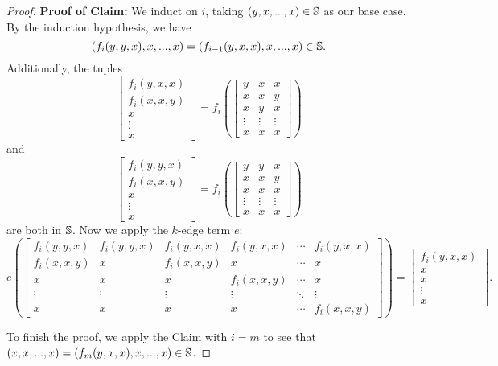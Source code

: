 \documentclass[letterpaper,11pt]{article}
\begin{document}
\begin{proof}
{\bf Proof of Claim:} We induct on $i$, taking $(y,x,...,x) \in \mathbb{S}$ as our base case. By the induction hypothesis, we have
\[
(f_i(y,y,x),x,...,x) = (f_{i-1}(y,x,x),x,...,x) \in \mathbb{S}.
\]
Additionally, the tuples
\[
\begin{bmatrix} f_i(y,x,x)\\ f_i(x,x,y)\\ x\\ \vdots \\ x\end{bmatrix} = f_i\left(\begin{bmatrix} y & x & x\\ x & x & y\\ x & y & x\\ \vdots & \vdots & \vdots \\ x & x & x\end{bmatrix}\right)
\]
and
\[
\begin{bmatrix} f_i(y,y,x)\\ f_i(x,x,y)\\ x\\ \vdots \\ x\end{bmatrix} = f_i\left(\begin{bmatrix} y & y & x\\ x & x & y\\ x & x & x\\ \vdots & \vdots & \vdots \\ x & x & x\end{bmatrix}\right)
\]
are both in $\mathbb{S}$. Now we apply the $k$-edge term $e$:
\[
e\left(\begin{bmatrix} f_i(y,y,x) & f_i(y,y,x) & f_i(y,x,x) & f_i(y,x,x) & \cdots & f_i(y,x,x)\\ f_i(x,x,y) & x & f_i(x,x,y) & x & \cdots & x\\ x & x & x & f_i(x,x,y) & \cdots & x\\ \vdots & \vdots & \vdots & \vdots & \ddots & \vdots \\ x & x & x & x & \cdots & f_i(x,x,y)\end{bmatrix}\right) = \begin{bmatrix} f_i(y,x,x)\\ x\\ x\\ \vdots \\ x\end{bmatrix}.
\]

To finish the proof, we apply the Claim with $i = m$ to see that $(x,x,...,x) = (f_m(y,x,x),x,...,x) \in \mathbb{S}$.
\end{proof}
\end{document}
